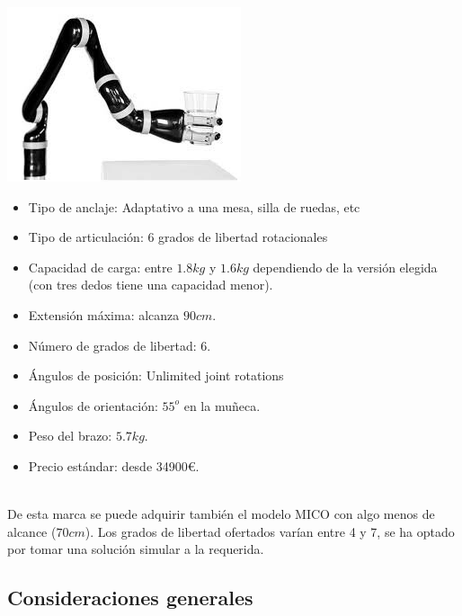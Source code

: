 	  \begin{minipage}{0.35\textwidth}
	  	\includegraphics[width=\linewidth]{figuras/Imagenes_EstadoArte/jaco-3-finger.jpg}
	  \end{minipage}
	  \begin{minipage}{0.65\textwidth}\raggedright
	  	\hspace{1cm}
	  	\begin{itemize}
	  		\item Tipo de anclaje: Adaptativo a una mesa, silla de ruedas, etc
	  		\item Tipo de articulación: 6 grados de libertad rotacionales
	  		\item Capacidad de carga: entre $1.8kg$ y $1.6kg$ dependiendo de la versión elegida (con tres dedos tiene una capacidad menor).
	  		\item Extensión máxima: alcanza $90cm$.
	  		\item Número de grados de libertad: 6.
	  		\item Ángulos de posición: Unlimited joint rotations 
	  		\item Ángulos de orientación: $55^o$ en la muñeca.
	  		\item Peso del brazo: $5.7kg$.
	  		\item Precio estándar: desde 34900\euro.
	  	\end{itemize}
	  \end{minipage}
	  \\ 
	  
	  \vspace{0.1cm} 
	  De esta marca se puede adquirir también el modelo MICO con algo menos de alcance ($70cm$). Los grados de libertad ofertados varían entre 4 y 7, se ha optado por tomar una solución simular a la requerida.
	 
 \subsection{Consideraciones generales}